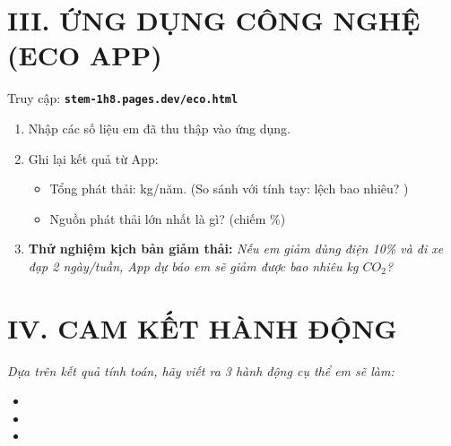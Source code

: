 \documentclass[12pt,a4paper]{article}
\begin{document}
\section*{\color{primary} III. ỨNG DỤNG CÔNG NGHỆ (ECO APP)}
Truy cập: \textbf{\texttt{stem-1h8.pages.dev/eco.html}}

\begin{enumerate}
    \item Nhập các số liệu em đã thu thập vào ứng dụng.
    \item Ghi lại kết quả từ App:
    \begin{itemize}
        \item Tổng phát thải: \dotfill kg/năm. (So sánh với tính tay: lệch bao nhiêu? \dotfill)
        \item Nguồn phát thải lớn nhất là gì? \dotfill (chiếm \dotfill \%)
    \end{itemize}
    \item \textbf{Thử nghiệm kịch bản giảm thải:} 
    \textit{Nếu em giảm dùng điện 10\% và đi xe đạp 2 ngày/tuần, App dự báo em sẽ giảm được bao nhiêu kg $CO_2$?}
    \vspace{1cm}
\end{enumerate}

\section*{\color{primary} IV. CAM KẾT HÀNH ĐỘNG}
\textit{Dựa trên kết quả tính toán, hãy viết ra 3 hành động cụ thể em sẽ làm:}
\begin{itemize}
    \item [1.] \dotfill
    \item [2.] \dotfill
    \item [3.] \dotfill
\end{itemize}
\end{document}
